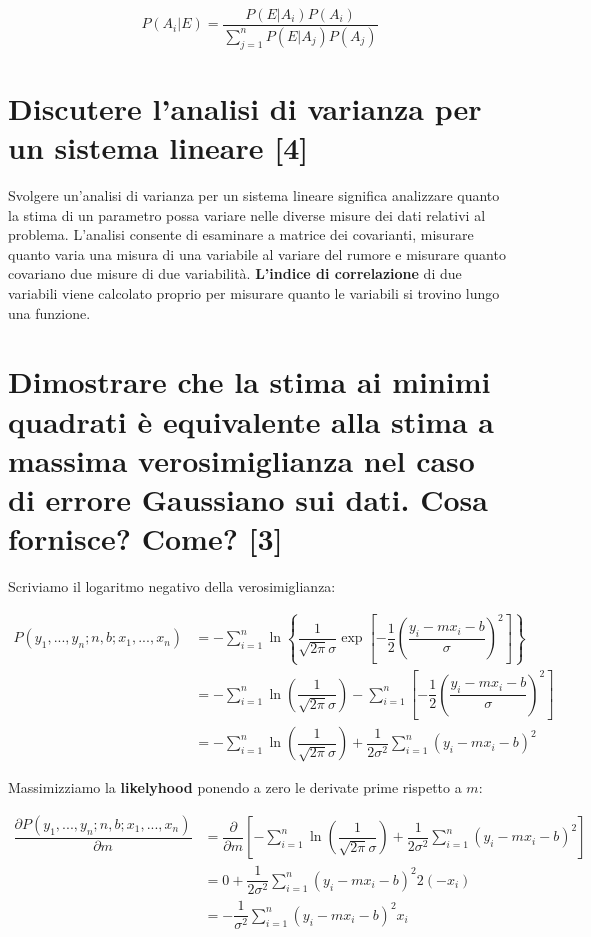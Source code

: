 \documentclass[\main/main.tex]{subfiles}
\begin{document}
\[
	P(A_i|E) = \dfrac{P(E|A_i)P(A_i)}{\sum_{j=1}^n P(E|A_j)P(A_j)}
\]

\section{Discutere l'analisi di varianza per un sistema lineare [4]}
Svolgere un'analisi di varianza per un sistema lineare significa analizzare quanto la stima di un parametro possa variare nelle diverse misure dei dati relativi al problema. 
L'analisi consente di esaminare a matrice dei covarianti, misurare quanto varia una misura di una variabile al variare del rumore e misurare quanto covariano due misure di due variabilità.
\textbf{L'indice di correlazione} di due variabili viene calcolato proprio per misurare quanto le variabili si trovino lungo una funzione.

\section{Dimostrare che la stima ai minimi quadrati è equivalente alla stima a massima verosimiglianza nel caso di errore Gaussiano sui dati. Cosa fornisce? Come? [3]}
Scriviamo il logaritmo negativo della verosimiglianza:

\begin{align}
P \left(y_1,...,y_n; n, b; x_1, ..., x_n \right)  &=
	- \sum_{i=1}^n 
	\ln \left\{
		\dfrac{1}{\sqrt{2\pi}\sigma}
		\exp \left[
		-\dfrac{1}{2}	\left(\dfrac{ y_i - mx_i - b}{\sigma} \right)^2
	 	\right]
	 \right\}\\
	 &= 
	 - \sum_{i=1}^n \ln
	 \left ( \dfrac{1}{\sqrt{2\pi}\sigma} \right )
	 - \sum_{i=1}^n
		\left[
		-\dfrac{1}{2}	\left(\dfrac{ y_i - mx_i - b}{\sigma} \right)^2
	 	\right]\\
	 &= 
	 - \sum_{i=1}^n \ln
	 \left ( \dfrac{1}{\sqrt{2\pi}\sigma} \right )
	 + \dfrac{1}{2\sigma^2} \sum_{i=1}^n
		\left(y_i - mx_i - b \right)^2
\end{align}

Massimizziamo la \textbf{likelyhood} ponendo a zero le derivate prime rispetto a $m$:

\begin{align}
	\dfrac{\partial P \left(y_1,...,y_n; n, b; x_1, ..., x_n \right)}{\partial m}  &= \dfrac{\partial}{\partial m} \left [ - \sum_{i=1}^n \ln
	 \left ( \dfrac{1}{\sqrt{2\pi}\sigma} \right )
	 + \dfrac{1}{2\sigma^2} \sum_{i=1}^n
		\left(y_i - mx_i - b \right)^2
	 	 \right ]\\
	 &= 0 + \dfrac{1}{2\sigma^2} \sum_{i=1}^n \left(y_i - mx_i - b \right)^2 2 (-x_i)\\
	 &= -\dfrac{1}{\sigma^2} \sum_{i=1}^n \left(y_i - mx_i - b \right)^2  x_i
\end{align}
\end{document}
